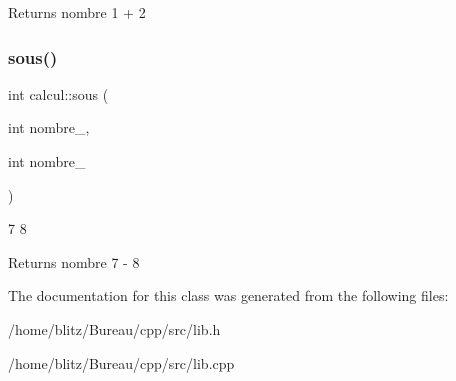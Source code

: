 \begin{DoxyReturn}{Returns}
nombre 1 + 2 
\end{DoxyReturn}
\mbox{\label{classcalcul_ad5891d57df21f31e4452ca175b1df055}} 
\subsubsection{\texorpdfstring{sous()}{sous()}}
{\footnotesize\ttfamily int calcul\+::sous (\begin{DoxyParamCaption}\item[{int}]{nombre\+\_,  }\item[{int}]{nombre\+\_ }\end{DoxyParamCaption})}



7  8 

\begin{DoxyReturn}{Returns}
nombre 7 -\/ 8 
\end{DoxyReturn}


The documentation for this class was generated from the following files\+:\begin{DoxyCompactItemize}
\item 
/home/blitz/\+Bureau/cpp/src/lib.\+h\item 
/home/blitz/\+Bureau/cpp/src/lib.\+cpp\end{DoxyCompactItemize}
